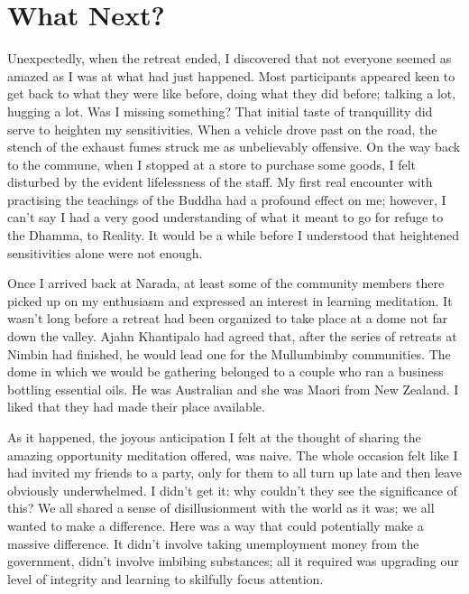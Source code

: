 \chapter{What Next?}

Unexpectedly, when the retreat ended, I discovered that not everyone
seemed as amazed as I was at what had just happened. Most participants
appeared keen to get back to what they were like before, doing what they
did before; talking a lot, hugging a lot. Was I missing something? That
initial taste of tranquillity did serve to heighten my sensitivities.
When a vehicle drove past on the road, the stench of the exhaust fumes
struck me as unbelievably offensive. On the way back to the commune,
when I stopped at a store to purchase some goods, I felt disturbed by
the evident lifelessness of the staff. My first real encounter with
practising the teachings of the Buddha had a profound effect on me;
however, I can't say I had a very good understanding of what it meant to
go for refuge to the Dhamma, to Reality. It would be a while before I
understood that heightened sensitivities alone were not enough.

Once I arrived back at Narada, at least some of the community members
there picked up on my enthusiasm and expressed an interest in learning
meditation. It wasn't long before a retreat had been organized to take
place at a dome not far down the valley. Ajahn Khantipalo had agreed
that, after the series of retreats at Nimbin had finished, he would lead
one for the Mullumbimby communities. The dome in which we would be
gathering belonged to a couple who ran a business bottling essential
oils. He was Australian and she was Maori from New Zealand. I liked that
they had made their place available.

As it happened, the joyous anticipation I felt at the thought of sharing
the amazing opportunity meditation offered, was naive. The whole
occasion felt like I had invited my friends to a party, only for them to
all turn up late and then leave obviously underwhelmed. I didn't get it:
why couldn't they see the significance of this? We all shared a sense of
disillusionment with the world as it was; we all wanted to make a
difference. Here was a way that could potentially make a massive
difference. It didn't involve taking unemployment money from the
government, didn't involve imbibing substances; all it required was
upgrading our level of integrity and learning to skilfully focus
attention.

